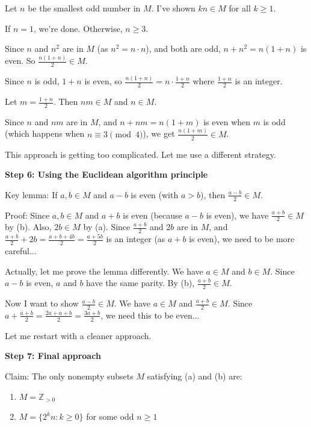 \documentclass[12pt,a4paper]{article}
\theoremstyle{definition}
\begin{document}
    Let $n$ be the smallest odd number in $M$. I've shown $kn \in M$ for all $k \geq 1$.

    If $n = 1$, we're done. Otherwise, $n \geq 3$.

    Since $n$ and $n^2$ are in $M$ (as $n^2 = n \cdot n$), and both are odd, $n + n^2 = n(1 + n)$ is even. So $\frac{n(1+n)}{2} \in M$.

    Since $n$ is odd, $1 + n$ is even, so $\frac{n(1+n)}{2} = n \cdot \frac{1+n}{2}$ where $\frac{1+n}{2}$ is an integer.

    Let $m = \frac{1+n}{2}$. Then $nm \in M$ and $n \in M$.

    Since $n$ and $nm$ are in $M$, and $n + nm = n(1+m)$ is even when $m$ is odd (which happens when $n \equiv 3 \pmod{4}$), we get $\frac{n(1+m)}{2} \in M$.

    This approach is getting too complicated. Let me use a different strategy.

    \textbf{Step 6: Using the Euclidean algorithm principle}

    Key lemma: If $a, b \in M$ and $a - b$ is even (with $a > b$), then $\frac{a-b}{2} \in M$.

    Proof: Since $a, b \in M$ and $a + b$ is even (because $a - b$ is even), we have $\frac{a+b}{2} \in M$ by (b).
    Also, $2b \in M$ by (a).
    Since $\frac{a+b}{2}$ and $2b$ are in $M$, and $\frac{a+b}{2} + 2b = \frac{a+b+4b}{2} = \frac{a+5b}{2}$ is an integer (as $a+b$ is even), we need to be more careful...

    Actually, let me prove the lemma differently. We have $a \in M$ and $b \in M$. Since $a - b$ is even, $a$ and $b$ have the same parity. By (b), $\frac{a+b}{2} \in M$.

    Now I want to show $\frac{a-b}{2} \in M$. We have $a \in M$ and $\frac{a+b}{2} \in M$. Since $a + \frac{a+b}{2} = \frac{2a + a + b}{2} = \frac{3a+b}{2}$, we need this to be even...

    Let me restart with a cleaner approach.

    \textbf{Step 7: Final approach}

    Claim: The only nonempty subsets $M$ satisfying (a) and (b) are:
    \begin{enumerate}
        \item $M = \mathbb{Z}_{>0}$
        \item $M = \{2^k n : k \geq 0\}$ for some odd $n \geq 1$
    \end{enumerate}
\end{document}

